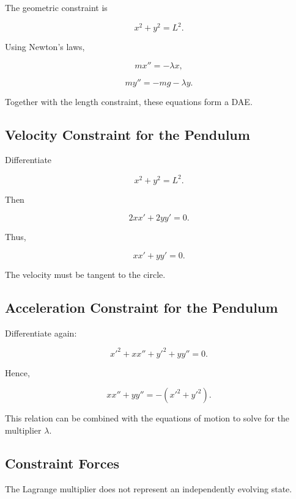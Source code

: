 The geometric constraint is

\[
\boxed{
x^2+y^2=L^2.
}
\]

Using Newton's laws,

\[
\boxed{
m x''
=
-\lambda x,
}
\]

\[
\boxed{
m y''
=
-mg-\lambda y.
}
\]

Together with the length constraint, these equations form a DAE.

\subsection{Velocity Constraint for the Pendulum}
\label{subsec:pendulum-velocity-constraint}

Differentiate

\[
x^2+y^2=L^2.
\]

Then

\[
2xx'
+
2yy'
=
0.
\]

Thus,

\[
\boxed{
xx'+yy'=0.
}
\]

The velocity must be tangent to the circle.

\subsection{Acceleration Constraint for the Pendulum}
\label{subsec:pendulum-acceleration-constraint}

Differentiate again:

\[
x'^2
+
xx''
+
y'^2
+
yy''
=
0.
\]

Hence,

\[
\boxed{
xx''
+
yy''
=
-
(x'^2+y'^2).
}
\]

This relation can be combined with the equations of motion to solve for
the multiplier \(\lambda\).

\subsection{Constraint Forces}
\label{subsec:constraint-forces-dae}

The Lagrange multiplier does not represent an independently evolving
state.

